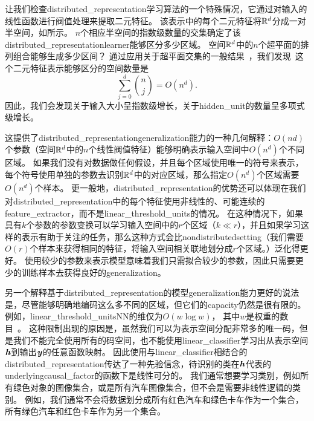 
让我们检查\gls{distributed_representation}学习算法的一个特殊情况，它通过对输入的线性函数进行阀值处理来提取二元特征。
该表示中的每个二元特征将$\mathbb{R}^d$分成一对半空间，如所示。
$n$个相应半空间的指数级数量的交集确定了该\gls{distributed_representation}\gls{learner}能够区分多少区域。
空间$\mathbb{R}^d$中的$n$个超平面的排列组合能够生成多少区间？
通过应用关于超平面交集的一般结果~\citep{Zaslavsky-1975}，我们发现~\citep{Pascanu+et+al-ICLR2014b}这个二元特征表示能够区分的空间数量是
\begin{equation}
	\sum_{j=0}^d \binom{n}{j} = O(n^d).
\end{equation}
因此，我们会发现关于输入大小呈指数级增长，关于\gls{hidden_unit}的数量呈多项式级增长。


这提供了\gls{distributed_representation}\gls{generalization}能力的一种几何解释：$O(nd)$个参数（空间$\mathbb{R}^d$中的$n$个线性阀值特征）能够明确表示输入空间中$O(n^d)$个不同区域。
如果我们没有对数据做任何假设，并且每个区域使用唯一的符号来表示，每个符号使用单独的参数去识别$\mathbb{R}^d$中的对应区域，那么指定$O(n^d)$个区域需要$O(n^d)$个样本。
更一般地，\gls{distributed_representation}的优势还可以体现在我们对\gls{distributed_representation}中的每个特征使用非线性的、可能连续的\gls{feature_extractor}，而不是\gls{linear_threshold_units}的情况。
在这种情况下，如果具有$k$个参数的参数变换可以学习输入空间中的$r$个区域（$k\ll r$），并且如果学习这样的表示有助于关注的任务，那么这种方式会比\gls{nondistributed}\gls{setting}（我们需要$O(r)$个样本来获得相同的特征，将输入空间相关联地划分成$r$个区域。）泛化得更好。
使用较少的参数来表示模型意味着我们只需拟合较少的参数，因此只需要更少的训练样本去获得良好的\gls{generalization}。


另一个解释基于\gls{distributed_representation}的模型\gls{generalization}能力更好的说法是，尽管能够明确地编码这么多不同的区域，但它们的\gls{capacity}仍然是很有限的。
例如，\gls{linear_threshold_units}\gls{NN}的维仅为$O(w\log w)$， 其中$w$是权重的数目~\citep{sontag1998vc}。
这种限制出现的原因是，虽然我们可以为表示空间分配非常多的唯一码，但是我们不能完全使用所有的码空间，也不能使用\gls{linear_classifier}学习出从表示空间$\boldsymbol{\mathit{h}}$到输出$\boldsymbol{\mathit{y}}$的任意函数映射。
因此使用与\gls{linear_classifier}相结合的\gls{distributed_representation}传达了一种先验信念，待识别的类在$\boldsymbol{\mathit{h}}$代表的\gls{underlying}\gls{causal_factor}的函数下是线性可分的。
我们通常想要学习类别，例如所有绿色对象的图像集合，或是所有汽车图像集合，但不会是需要非线性逻辑的类别。
例如，我们通常不会将数据划分成所有红色汽车和绿色卡车作为一个集合，所有绿色汽车和红色卡车作为另一个集合。

